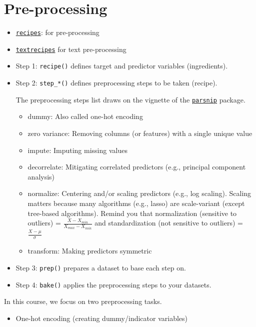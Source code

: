 \documentclass[
]{book}
\providecommand{\tightlist}{%
  \setlength{\itemsep}{0pt}\setlength{\parskip}{0pt}}
\begin{document}
\section{Pre-processing}\label{pre-processing}

\begin{itemize}
\item
  \href{https://recipes.tidymodels.org/index.html}{\texttt{recipes}}: for pre-processing
\item
  \href{https://github.com/tidymodels/textrecipes}{\texttt{textrecipes}} for text pre-processing
\item
  Step 1: \texttt{recipe()} defines target and predictor variables (ingredients).
\item
  Step 2: \texttt{step\_*()} defines preprocessing steps to be taken (recipe).

  The preprocessing steps list draws on the vignette of the \href{https://www.tidymodels.org/find/parsnip/}{\texttt{parsnip}} package.

  \begin{itemize}
  \item
    dummy: Also called one-hot encoding
  \item
    zero variance: Removing columns (or features) with a single unique value
  \item
    impute: Imputing missing values
  \item
    decorrelate: Mitigating correlated predictors (e.g., principal component analysis)
  \item
    normalize: Centering and/or scaling predictors (e.g., log scaling). Scaling matters because many algorithms (e.g., lasso) are scale-variant (except tree-based algorithms). Remind you that normalization (sensitive to outliers) = \(\frac{X - X_{min}}{X_{max} - X_{min}}\) and standardization (not sensitive to outliers) = \(\frac{X - \mu}{\sigma}\)
  \item
    transform: Making predictors symmetric
  \end{itemize}
\item
  Step 3: \texttt{prep()} prepares a dataset to base each step on.
\item
  Step 4: \texttt{bake()} applies the preprocessing steps to your datasets.
\end{itemize}

In this course, we focus on two preprocessing tasks.

\begin{itemize}
\tightlist
\item
  One-hot encoding (creating dummy/indicator variables)
\end{itemize}
\end{document}

